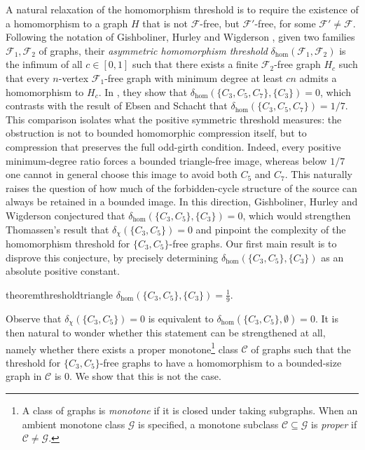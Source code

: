 \documentclass{article}
\begin{document}
A natural relaxation of the homomorphism threshold is to require the existence of a homomorphism to a graph $H$ that is not $\mathcal{F}$-free, but $\mathcal{F}'$-free, for some $\mathcal{F}' \neq \mathcal{F}$.
Following the notation of Gishboliner, Hurley and Wigderson \cite{GHW26}, given two families $\mathcal{F}_1, \mathcal{F}_2$ of graphs, their \emph{asymmetric homomorphism threshold} $\delta_{\hom}(\mathcal{F}_1, \mathcal{F}_2)$ is the infimum of all $c \in [0, 1]$ such that there exists a finite $\mathcal{F}_2$-free graph $H_c$ such that every $n$-vertex $\mathcal{F}_1$-free graph with minimum degree at least $cn$ admits a homomorphism to $H_c$.
In \cite{GHW26}, they show that $\delta_{\hom}(\{C_3, C_5, C_7\}, \{C_3\}) = 0$, which contrasts with the result of Ebsen and Schacht \cite{ES20} that $\delta_{\hom}(\{C_3, C_5, C_7\}) = 1/7$.
This comparison isolates what the positive symmetric threshold measures: the obstruction is not to bounded homomorphic compression itself, but to compression that preserves the full odd-girth condition. Indeed, every positive minimum-degree ratio forces a bounded triangle-free image, whereas below $1/7$ one cannot in general choose this image to avoid both $C_5$ and $C_7$. This naturally raises the question of how much of the forbidden-cycle structure of the source can always be retained in a bounded image.
In this direction, Gishboliner, Hurley and Wigderson conjectured that $\delta_{\hom}(\{C_3, C_5\}, \{C_3\}) = 0$, which would strengthen Thomassen's result that $\delta_{\chi}(\{C_3, C_5\}) = 0$ and pinpoint the complexity of the homomorphism threshold for $\{C_3, C_5\}$-free graphs. Our first main result is to disprove this conjecture, by precisely determining $\delta_{\hom}(\{C_3, C_5\}, \{C_3\})$ as an absolute positive constant.

\begin{restatable}{theorem}{thresholdtriangle}\label{thm:threshold-triangle}
    $\delta_{\hom}(\{C_3, C_5\}, \{C_3\}) = \frac{1}{9}$.
\end{restatable}

Observe that $\delta_{\chi}(\{C_3, C_5\}) = 0$ is equivalent to $\delta_{\hom}(\{C_3, C_5\}, \emptyset) = 0$. 
It is then natural to wonder whether this statement can be strengthened at all, namely  whether there exists a proper monotone\footnote{A class of graphs is \emph{monotone} if it is closed under taking subgraphs. When an ambient monotone class $\mathcal G$ is specified, a monotone subclass $\mathcal C\subseteq\mathcal G$ is \emph{proper} if $\mathcal C\neq\mathcal G$.} class $\mathcal{C}$ of graphs such that the threshold for $\{C_3, C_5\}$-free graphs to have a homomorphism to a bounded-size graph in $\mathcal{C}$ is $0$. 
We show that this is not the case.
\end{document}
